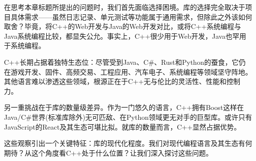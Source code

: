 在思考本章标题所提出的问题时，我们首先面临选择困境。库的选择完全取决于项目具体需求——虽然日志记录、单元测试等功能属于通用需求，但除此之外该如何取舍？毕竟，将C++的Web开发与Java的Web开发对比，或将C++系统编程与Java系统编程比较，都显失公允。事实上，C++很少用于Web开发，Java也罕用于系统编程。

C++长期占据着独特生态位：尽管受到Java、C\#、Rust和Python的蚕食，它仍在游戏开发、固件、高频交易、工程应用、汽车电子、系统编程等领域坚守阵地。其他语言难以渗透这些领域，根源正在于C++无与伦比的灵活性、性能和控制力。

另一重挑战在于库的数量级差异。作为一门悠久的语言，C++拥有Boost这样在Java/C\#世界(标准库除外)无可匹敌、在Python领域更无对手的巨型库。或许只有JavaScript的React及其生态可堪比拟。就库的数量而言，C++显然占据优势。

这些观察引出一个关键特征：库的现代化程度。我们对现代编程语言及其生态有何期待？从这个角度看C++处于什么位置？让我们深入探讨这些问题。